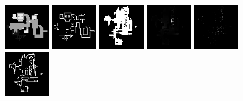 \begin{figure}[h!]
\begin{minipage}[b]{\linewidth}
	\begin{center}
		\includegraphics[width=2cm]{figures/results/samples/cond/sample17_map_heightmap_true.png}
		\includegraphics[width=2cm]{figures/results/samples/cond/sample17_map_wallmap_true.png}
		\hfill 
		\includegraphics[width=2cm]{figures/results/samples/cond/sample17_map_floormap_generated.png}
		\includegraphics[width=2cm]{figures/results/samples/cond/sample17_map_heightmap_generated.png}
		\includegraphics[width=2cm]{figures/results/samples/cond/sample17_map_thingsmap_generated.png}
		\includegraphics[width=2cm]{figures/results/samples/cond/sample17_map_wallmap_generated.png}
	\end{center}
	

\end{minipage}
\end{figure}
